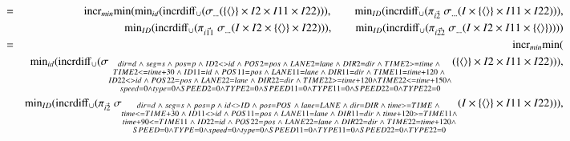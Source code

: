 \pagebreak
\begin{eqnarray*}
&=& \algincr_{min} \algmin (\algmin_{id} (\algincrdiff_{\cup} (\sigma_{\dots}(  \{\tuple{} \} \times I2 \times I11 \times I22))) , 
\qquad\algmin_{ID}(\algincrdiff_{\cup} (\pi_{\vec{i2}} \;\sigma_{\dots}(I \times \{\tuple{} \} \times I11 \times I22))) ,
\\&&\qquad\algmin_{ID}(\algincrdiff_{\cup} (\pi_{\vec{i11}} \;\sigma_{\dots}(I \times  I2 \times  \{\tuple{} \} \times I22))) , 
\qquad\algmin_{ID}(\algincrdiff_{\cup} (\pi_{\vec{i22}} \;\sigma_{ \dots}(I \times I2 \times I11 \times \{\tuple{} \} ))))\\
&=& \algincr_{min} \algmin (\\
&& \algmin_{id} (\algincrdiff_{\cup} (\sigma_{\substack{dir = d \;\wedge\; seg = s \;\wedge\; pos = p \;\wedge\; ID2 <> id \;\wedge\; POS2 = pos \;\wedge\; LANE2 = lane \;\wedge\; DIR2 = dir \;\wedge\;  TIME2 >= time \;\wedge\; \\TIME2 <= time + 30 \;\wedge\; ID11 = id \;\wedge\; POS11 = pos \;\wedge\;  LANE11 = lane \;\wedge\; DIR11= dir \;\wedge\; TIME11 = time + 120 \;\wedge\; \\ID22 <> id \;\wedge\; POS22 = pos \;\wedge\;  LANE22 = lane \;\wedge\; DIR22 = dir \;\wedge\; TIME22 >= time + 120 \wedge TIME22 <= time + 150 \wedge \\ speed = 0 \wedge type = 0 \wedge SPEED2 = 0 \wedge TYPE2 = 0 \wedge  SPEED11 = 0 \wedge TYPE11 = 0 \wedge SPEED22 = 0 \wedge TYPE22 =0 }}(  \{\tuple{} \} \times I2 \times I11 \times I22))) , \\
%
&&\algmin_{ID}(\algincrdiff_{\cup} (\pi_{\vec{i2}} \;\sigma_{\substack{dir = d \;\wedge\; seg = s \;\wedge\; pos = p \;\wedge\; id <> ID \;\wedge\; pos = POS \;\wedge\; lane = LANE \;\wedge\; dir = DIR \;\wedge\;  time >= TIME \;\wedge\;\\ time <= TIME + 30 \;\wedge\; ID11 <> id \;\wedge\; POS11 = pos \;\wedge\;  LANE11 = lane \;\wedge\; DIR11= dir \;\wedge\;  time + 120 >= TIME11 \wedge\\ time + 90 <= TIME11 \;\wedge\; ID22 = id \;\wedge\; POS22 = pos \;\wedge\;  LANE22 = lane \;\wedge\; DIR22 = dir \;\wedge\; TIME22 = time + 120 \wedge \\SPEED = 0 \wedge TYPE = 0 \wedge speed = 0 \wedge type = 0 \wedge  SPEED11 = 0 \wedge TYPE11 = 0 \wedge SPEED22 = 0 \wedge TYPE22 =0 }}(I \times \{\tuple{} \} \times I11 \times I22))) ,\\

\end{eqnarray*}

